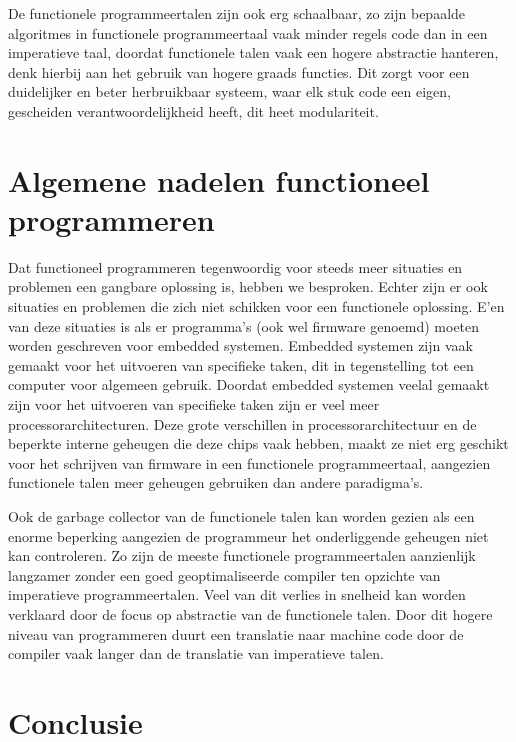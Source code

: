 \documentclass[twoside,twocolumn]{article}
\begin{document}
De functionele programmeertalen zijn ook erg schaalbaar, zo zijn bepaalde
algoritmes in functionele programmeertaal vaak minder regels code dan in een
imperatieve taal, doordat functionele talen vaak een hogere abstractie
hanteren, denk hierbij aan het gebruik van hogere graads functies. Dit zorgt
voor een duidelijker en beter herbruikbaar systeem, waar elk stuk code een
eigen, gescheiden verantwoordelijkheid heeft, dit heet modulariteit.


\section{Algemene nadelen functioneel programmeren}
Dat functioneel programmeren tegenwoordig voor steeds meer situaties en
problemen een gangbare oplossing is, hebben we besproken. Echter zijn er ook
situaties en problemen die zich niet schikken voor een functionele oplossing.
E\a'en van deze situaties is als er programma's (ook wel firmware genoemd)
moeten worden geschreven voor embedded systemen. Embedded systemen zijn vaak
gemaakt voor het uitvoeren van specifieke taken, dit in tegenstelling tot
een computer voor algemeen gebruik. Doordat embedded systemen veelal gemaakt
zijn voor het uitvoeren van specifieke taken zijn er veel meer
processorarchitecturen. Deze grote verschillen in processorarchitectuur en de
beperkte interne geheugen die deze chips vaak hebben, maakt ze niet erg
geschikt voor het schrijven van firmware in een functionele programmeertaal,
aangezien functionele talen meer geheugen gebruiken dan andere paradigma's.

Ook de garbage collector van de functionele talen kan worden gezien als een
enorme beperking aangezien de programmeur het onderliggende geheugen niet kan
controleren. Zo zijn de meeste functionele programmeertalen aanzienlijk
langzamer zonder een goed geoptimaliseerde compiler ten opzichte van
imperatieve programmeertalen. Veel van dit verlies in snelheid kan worden
verklaard door de focus op abstractie van de functionele talen. Door dit hogere
niveau van programmeren duurt een translatie naar machine code door de compiler
vaak langer dan de translatie van imperatieve talen.

\section{Conclusie}
\blindtext %
\end{document}
